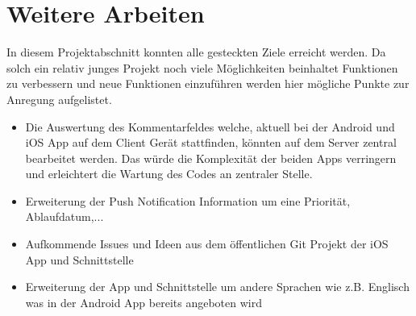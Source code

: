 \section{Weitere Arbeiten}
In diesem Projektabschnitt konnten alle gesteckten Ziele erreicht werden. Da solch ein relativ junges Projekt noch viele Möglichkeiten beinhaltet Funktionen zu verbessern und neue Funktionen einzuführen werden hier mögliche Punkte zur Anregung aufgelistet.

\begin{itemize}
\item Die Auswertung des Kommentarfeldes welche, aktuell bei der Android und iOS App auf dem Client Gerät stattfinden, könnten auf dem Server zentral bearbeitet werden. Das würde die Komplexität der beiden Apps verringern und erleichtert die Wartung des Codes an zentraler Stelle.
\item Erweiterung der Push Notification Information um eine Priorität, Ablaufdatum,...
\item Aufkommende Issues und Ideen aus dem öffentlichen Git Projekt der iOS App und Schnittstelle
\item Erweiterung der App und Schnittstelle um andere Sprachen wie z.B. Englisch was in der Android App bereits angeboten wird

\end{itemize}

